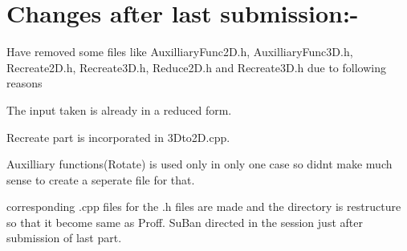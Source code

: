 \section*{Changes after last submission\+:-\/}

Have removed some files like Auxilliary\+Func2\+D.\+h, Auxilliary\+Func3\+D.\+h, Recreate2\+D.\+h, Recreate3\+D.\+h, Reduce2\+D.\+h and Recreate3\+D.\+h due to following reasons
\begin{DoxyEnumerate}
\item The input taken is already in a reduced form.
\item Recreate part is incorporated in 3\+Dto2\+D.\+cpp.
\item Auxilliary functions(\+Rotate) is used only in only one case so didn\textquotesingle{}t make much sense to create a seperate file for that.
\item corresponding .cpp files for the .h files are made and the directory is restructure so that it become same as Proff. Su\+Ban directed in the session just after submission of last part. 
\end{DoxyEnumerate}